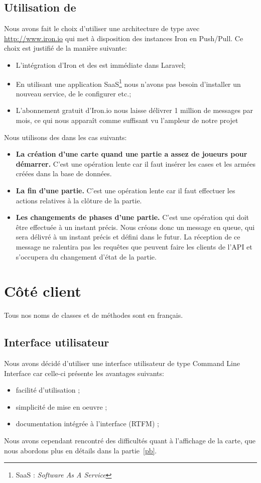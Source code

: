 	\subsection{Utilisation de \ppq{}}
		Nous avons fait le choix d'utiliser une architecture de type \ppq{} avec \url{http://www.iron.io} qui met à disposition des instances Iron en Push/Pull. Ce choix est justifié de la manière suivante:
		\begin{itemize}
			\item L'intégration d'Iron et des \ppq{} est immédiate dans Laravel;
			\item En utilisant une application SaaS\footnote{SaaS : \textit{Software As A Service}} nous n'avons pas besoin d'installer un nouveau service, de le configurer etc.;
			\item L'abonnement gratuit d'Iron.io nous laisse délivrer 1 million de messages par mois, ce qui nous apparaît comme suffisant vu l'ampleur de notre projet
		\end{itemize}\bigskip

		Nous utilisons des \ppq{} dans les cas suivants:
		\begin{itemize}
			\item \textbf{La création d'une carte quand une partie a assez de joueurs pour démarrer.} C'est une opération lente car il faut insérer les cases et les armées créées dans la base de données.
			\item \textbf{La fin d'une partie.} C'est une opération lente car il faut effectuer les actions relatives à la clôture de la partie.
			\item \textbf{Les changements de phases d'une partie.} C'est une opération qui doit être effectuée à un instant précis. Nous créons donc un message en queue, qui sera délivré à un instant précis et défini dans le futur. La réception de ce message ne ralentira pas les requêtes que peuvent faire les clients de l'API et s'occupera du changement d'état de la partie.
		\end{itemize}

\section{Côté client}
	Tous nos noms de classes et de méthodes sont en français.

	\subsection{Interface utilisateur}
		Nous avons décidé d'utiliser une interface utilisateur de type Command Line Interface car celle-ci présente les avantages suivants:
		\begin{itemize}
			\item facilité d'utilisation ;
			\item simplicité de mise en oeuvre ;
			\item documentation intégrée à l'interface (RTFM) ;
		\end{itemize}\bigskip
		Nous avons cependant rencontré des difficultés quant à l'affichage de la carte, que nous abordons plus en détails dans la partie~\ref{pb}.

